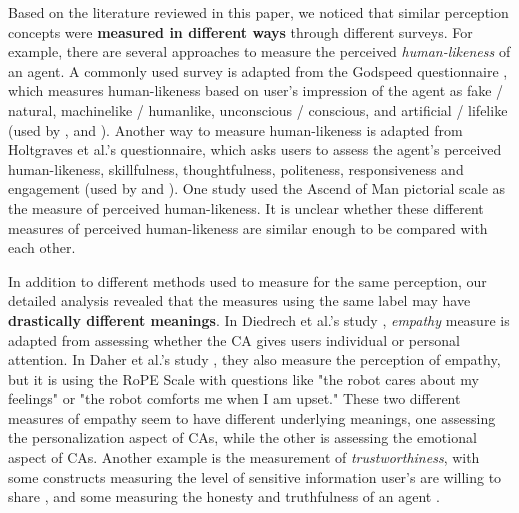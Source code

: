 \documentclass[sigconf,screen,review, anonymous]{acmart}
\newcommand{\cmt}[1]{}%
\begin{document}
Based on the literature reviewed in this paper, we noticed that similar perception concepts were \textbf{measured in different ways} through different surveys. For example, there are several approaches to measure the perceived \textit{human-likeness} of an agent. A commonly used survey is adapted from the Godspeed questionnaire \cite{bartneck2009measurement}, which measures human-likeness based on user's impression of the agent as fake / natural, machinelike / humanlike, unconscious / conscious, and artificial / lifelike (used by \cite{hoegen2019end}\cmt{[31]}, \cite{jeong2019exploring}\cmt{[10]} and \cite{ouchi2019should}\cmt{[59]}). Another way to measure human-likeness is adapted from Holtgraves et al.'s \cite{holtgraves2007perceiving} questionnaire, which asks users to assess the agent's perceived human-likeness, skillfulness, thoughtfulness, politeness, responsiveness and engagement (used by \cite{diederich2019emulating}\cmt{[25]} and  \cite{gnewuch2018faster}\cmt{[19]}). One study \cite{westerman2019believe}\cmt{[9]} used the Ascend of Man pictorial scale \cite{kteily2015ascent} as the measure of perceived human-likeness. It is unclear whether these different measures of perceived human-likeness are similar enough to be compared with each other.

 In addition to different methods used to measure for the same perception, our detailed analysis revealed that the measures using the same label may have \textbf{drastically different meanings}. In Diedrech et al.'s study \cite{diederich2019emulating}\cmt{[25]}, \textit{empathy} measure is adapted from \cite{yan2013role} assessing whether the CA gives users individual or personal attention. In Daher et al.'s study \cite{daher2020empathic}\cmt{[58]}, they also measure the perception of empathy, but it is using the RoPE Scale \cite{charrier2019rope} with questions like "the robot cares about my feelings" or "the robot comforts me when I am upset." These two different measures of empathy seem to have different underlying meanings, one assessing the personalization aspect of CAs, while the other is assessing the emotional aspect of CAs. Another example is the measurement of \textit{trustworthiness}, with some constructs measuring the level of sensitive information user's are willing to share \cite{dinev2006privacy}, and some measuring the honesty and truthfulness of an agent \cite{lee2017enhancing}. 
\end{document}
